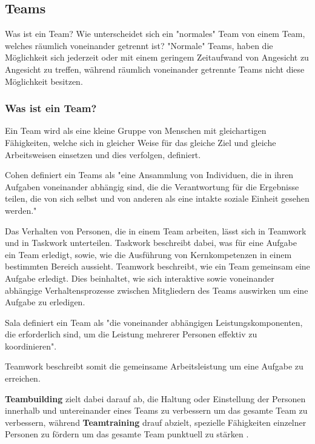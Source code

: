 \documentclass[a4paper,11pt]{article}%
\renewcommand{\\}{\vspace*{0.5\baselineskip} \newline}
\begin{document}
\newpage
	\subsection{Teams}		
	\label{Teamwork}
Was ist ein Team? Wie unterscheidet sich ein "normales" Team von einem Team, welches räumlich voneinander getrennt ist? "Normale" Teams, haben die Möglichkeit sich jederzeit oder mit einem geringem Zeitaufwand von Angesicht zu Angesicht zu treffen, während räumlich voneinander getrennte Teams nicht diese Möglichkeit besitzen.

\subsubsection{Was ist ein Team?}
\label{team}
	Ein Team wird als eine kleine Gruppe von Menschen mit gleichartigen Fähigkeiten, welche sich in gleicher Weise für das gleiche Ziel und gleiche Arbeitsweisen einsetzen und dies verfolgen, definiert\citep[p.2]{zenun2007effects}.
	
Cohen \citep[p.557]{cohen1997makes} definiert ein Teams als "eine Ansammlung von Individuen, die in ihren Aufgaben voneinander abhängig sind, die die Verantwortung für die Ergebnisse teilen, die von sich selbst und von anderen als eine intakte soziale Einheit gesehen werden."

Das Verhalten von Personen, die in einem Team arbeiten, lässt sich in \glqq Teamwork \grqq und in \glqq Taskwork \grqq unterteilen. \citep[p. 541-542]{rousseau2006teamwork}
Taskwork beschreibt dabei, was für eine Aufgabe ein Team erledigt, sowie, wie die Ausführung von Kernkompetenzen in einem bestimmten Bereich aussieht. 
Teamwork beschreibt, wie ein Team gemeinsam eine Aufgabe erledigt. Dies beinhaltet, wie sich interaktive sowie voneinander abhängige Verhaltensprozesse zwischen Mitgliedern des Teams auswirken um eine Aufgabe zu erledigen\citep[p. 357]{marks2001temporally}.

Sala \citep[p.541]{salas2008teams} definiert ein Team als "die voneinander abhängigen Leistungskomponenten, die erforderlich sind, um die Leistung mehrerer Personen effektiv zu koordinieren".

Teamwork beschreibt somit die gemeinsame Arbeitsleistung um eine Aufgabe zu erreichen.

\textbf{Teambuilding} zielt dabei darauf ab, die Haltung oder Einstellung der Personen innerhalb und untereinander eines Teams zu verbessern um das gesamte Team zu verbessern, während \textbf{Teamtraining} drauf abzielt, spezielle Fähigkeiten einzelner Personen zu fördern um das gesamte Team punktuell zu stärken \citep[p. 367-369]{shuffler2011there}.
		
\end{document}
